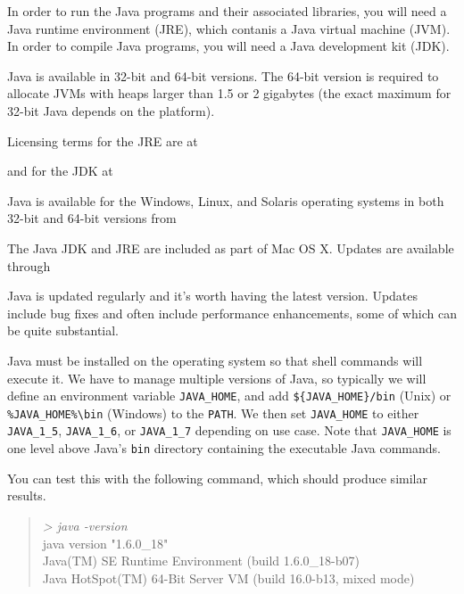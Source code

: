 In order to run the Java programs and their
associated libraries, you will need a Java runtime environment (JRE),
which contanis a Java virtual machine (JVM).  In order to compile Java
programs, you will need a Java development kit (JDK).

Java is available in 32-bit and 64-bit versions.  The 64-bit version
is required to allocate JVMs with heaps larger than 1.5 or 2 gigabytes
(the exact maximum for 32-bit Java depends on the platform).  

Licensing terms for the JRE are at
%
\begin{quote}
\end{quote}
and for the JDK at
%
\begin{quote}
\end{quote}

Java is available for the Windows, Linux, and Solaris operating
systems in both 32-bit and 64-bit versions from
%
\begin{quote}
\end{quote}
%
The Java JDK and JRE are included as part of Mac OS X.  Updates are
available through
%
\begin{quote}
\end{quote}
%
Java is updated regularly and it's worth having the latest version.
Updates include bug fixes and often include performance enhancements,
some of which can be quite substantial.

Java must be installed on the operating system so that shell commands
will execute it.  We have to manage multiple versions of Java, so
typically we will define an environment variable {\tt JAVA\_HOME}, and
add {\tt \$\{JAVA\_HOME\}/bin} (Unix) or {\tt \%JAVA\_HOME\%{\textbackslash}bin} (Windows) 
to the {\tt PATH}.  We then set {\tt JAVA\_HOME} to either {\tt
JAVA\_1\_5}, {\tt JAVA\_1\_6}, or {\tt JAVA\_1\_7} depending on use
case.  Note that {\tt JAVA\_HOME} is one level above Java's {\tt bin}
directory containing the executable Java commands.

You can test this with the following command, which
should produce similar results.

\begin{quote}
{\small
\ttfamily
{\it\ttfamily > java -version}
\\
java version "1.6.0\_18"
\\
Java(TM) SE Runtime Environment (build 1.6.0\_18-b07)
\\
Java HotSpot(TM) 64-Bit Server VM (build 16.0-b13, mixed mode)
}
\end{quote}


